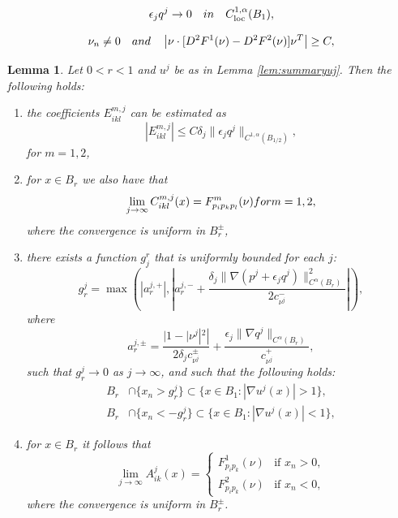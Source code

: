 \documentclass[10pt,a4paper]{amsart}
\newtheorem{lem}{Lemma}
\newcommand{\loc}{\mathrm{loc}}
\begin{document}
    \begin{equation}
        \epsilon_j q^j \to 0 \quad \textup{in} \quad C^{1,\alpha}_{\loc}(B_1),
    \end{equation}

    \begin{equation}
 \nu_n \neq 0 \quad \textup{and} \quad \left|\nu \cdot [D^2 F^1(\nu)- D^2 F^2(\nu)]  \nu^T \right| \geq C,
\end{equation}

\begin{lem}\label{lem:conv_AjikCmjikl}
Let $0<r<1$ and $u^j$ be as in Lemma \ref{lem:summaryuj}. Then the following holds:
 \begin{enumerate}
     \item the coefficients $E^{m,j}_{ikl}$ can be estimated as
 \begin{equation}\label{eq:Eikl}
   |E^{m,j}_{ikl}| \leq C \delta_j  \|\epsilon_j q^j\|_{C^{1, \alpha}(B_{1/2})},
 \end{equation}
 for $m=1,2$,
 \item for $x \in B_r$ we also have that
\begin{equation}
\label{eq:Ccoeffconv}
       \lim_{j\to \infty} C^{m,j}_{ikl}(x) =  F^m_{p_i p_k p_l}(\nu)\textup{ for } m = 1,2,
\end{equation}
where the convergence is uniform in $B_r^{\pm}$,
\item 
there exists a function $g^r_j$ that is uniformly bounded for each $j$:
$$
g_r^j = \max \!\left(\left|a^{j,+}_r\right|, \left|a^{j, -}_r+ \frac{\delta_j \|\nabla (p^j +\epsilon_j q^j)\|^2_{C^{\alpha}(B_r)}}{2c_{\nu^j}^{-}}\right| \right) \!,
$$
where
$$
a^{j, \pm}_r = \frac{|1-|\nu^j|^2|}{2\delta_j c_{\nu^j}^{\pm}}+\frac{ \epsilon_j \|\nabla q^j\|_{C^{\alpha}(B_r)}}{c_{\nu^j}^+},
$$
such that $g^j_r \to 0$ as $j\to \infty$, and such that the following holds:
\begin{align}\label{eq:fbestimate1}
    B_r& \cap \{x_n>g^j_r \} \subset \{ x \in B_1: |\nabla u^j(x)|>1 \}, \\
    B_r& \cap \{x_n < -g^j_r \} \subset \{ x \in B_1: |\nabla u^j(x)|<1 \}, \label{eq:fbestimate2}
\end{align}
\item
for $x \in B_r$ it follows that
\begin{equation}
\label{eq:Acoeffconv}
\lim_{j\to \infty} A^j_{ik}(x) =\left\{\begin{array}{ll}
                                        F^1_{p_ip_k}(\nu) & \textrm{if }x_n > 0, \\
                                        F^2_{p_ip_k}(\nu) & \textrm{if }x_n< 0,
                                       \end{array}
\right.
\end{equation}
where the convergence is uniform in $B_r^{\pm}$.
 \end{enumerate}
\end{lem}
\end{document}
